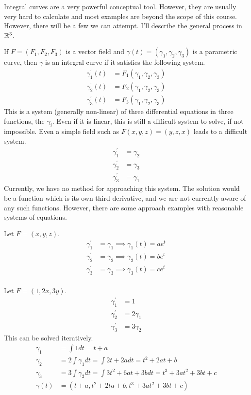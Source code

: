 \documentclass[fleqn,letterpaper]{report}
\begin{document}
Integral curves are a very powerful conceptual tool. However,
they are usually very hard to calculate and most examples are
beyond the scope of this course. However, there will be a few
we can attempt. I'll describe the general process in $\mathbb{R}^3$.

If $F = (F_1,F_2,F_3)$ is a vector field and $\gamma(t) =
(\gamma_1, \gamma_2,\gamma_3)$ is a parametric curve, then
$\gamma$ is an integral curve if it satisfies the following
system.
\begin{align*}
\gamma_1^\prime(t) & = F_1(\gamma_1, \gamma_2, \gamma_3) \\
\gamma_2^\prime(t) & = F_2(\gamma_1, \gamma_2, \gamma_3) \\
\gamma_3^\prime(t) & = F_3(\gamma_1, \gamma_2, \gamma_3)
\end{align*}
This is a system (generally non-linear) of three
differential equations in three functions, the $\gamma_i$.
Even if it is linear, this is still a difficult system to
solve, if not impossible. Even a simple
field such as $F(x,y,z) = (y,z,x)$ leads to a difficult
system.
\begin{align*}
\gamma_1^\prime & = \gamma_2 \\
\gamma_2^\prime & = \gamma_3 \\
\gamma_3^\prime & = \gamma_1 
\end{align*}
Currently, we have no method for approaching this system. The
solution would be a function which is its own third
derivative, and we are not currently aware of any such
functions. However, there are some approach examples with
reasonable systems of equations.

\begin{example}
Let $F = (x,y,z)$.
\begin{align*}
\gamma_1^\prime & = \gamma_1 \implies \gamma_1(t) = ae^t \\
\gamma_2^\prime & = \gamma_2 \implies \gamma_2(t) = be^t \\
\gamma_3^\prime & = \gamma_3 \implies \gamma_3(t) = ce^t \\
\end{align*}
\end{example}

\begin{example}
Let $F = (1,2x,3y)$. 
\begin{align*}
\gamma_1^\prime & = 1 \\
\gamma_2^\prime & = 2\gamma_1 \\
\gamma_3^\prime & = 3\gamma_2 
\end{align*}
This can be solved iteratively.
\begin{align*}
\gamma_1 & = \int 1 dt = t + a \\
\gamma_2 & = 2\int \gamma_1 dt = \int 2t + 2a dt = t^2 + 2at + b
\\
\gamma_3 & = 3 \int \gamma_2 dt = \int 3t^2 + 6at + 3b dt = t^3
+ 3at^2 + 3bt + c \\
\gamma(t) & = (t+a, t^2 + 2ta + b, t^3 + 3at^2 + 3bt + c) 
\end{align*}
\end{example}
\end{document}
